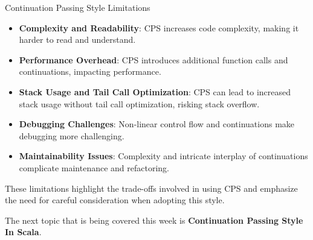 \begin{notes}{Continuation Passing Style Limitations}
\begin{highlight}
        \begin{itemize}
            \item \textbf{Complexity and Readability}: CPS increases code complexity, making it harder to read and understand.
            \item \textbf{Performance Overhead}: CPS introduces additional function calls and continuations, impacting performance.
            \item \textbf{Stack Usage and Tail Call Optimization}: CPS can lead to increased stack usage without tail call optimization, risking stack overflow.
            \item \textbf{Debugging Challenges}: Non-linear control flow and continuations make debugging more challenging.
            \item \textbf{Maintainability Issues}: Complexity and intricate interplay of continuations complicate maintenance and refactoring.
        \end{itemize}
    
        These limitations highlight the trade-offs involved in using CPS and emphasize the need for careful consideration when adopting this style.
    
    \end{highlight}
\end{notes}

The next topic that is being covered this week is \textbf{Continuation Passing Style In Scala}.

